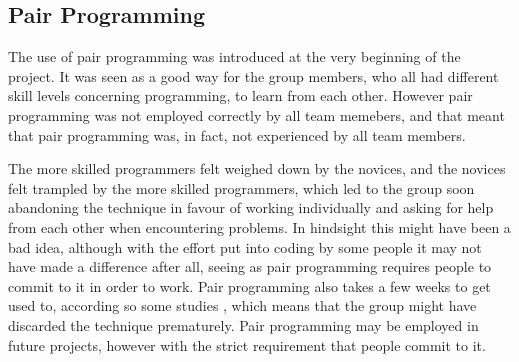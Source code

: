 \subsection{Pair Programming}
The use of pair programming was introduced at the very beginning of the project. It was seen as a good way for the group
members, who all had different skill levels concerning programming, to learn from each other. However pair programming was not
employed correctly by all team memebers, and that meant that pair programming was, in fact, not experienced by all team
members. 

The more skilled programmers felt weighed down by the novices, and the novices felt trampled by the more skilled
programmers, which led to the group soon abandoning the technique in favour of working individually and asking for help from
each other when encountering problems. In hindsight this might have been a bad idea, although with the effort put into coding
by some people it may not have made a difference after all, seeing as pair programming requires people to commit to it in
order to work. Pair programming also takes a few weeks to get used to, according so some studies \cite{cockburn00}, which means that the group
might have discarded the technique prematurely. Pair programming may be employed in future projects, however with the strict
requirement that people commit to it.